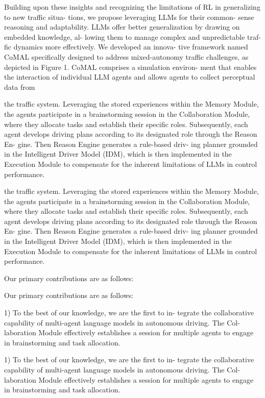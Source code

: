 \documentclass[12pt]{article}
\begin{document}
Building upon these insights and recognizing the
limitations of RL in generalizing to new traffic situa-
tions, we propose leveraging LLMs for their common-
sense reasoning and adaptability. LLMs offer better
generalization by drawing on embedded knowledge, al-
lowing them to manage complex and unpredictable traf-
fic dynamics more effectively. We developed an innova-
tive framework named CoMAL specifically designed to
address mixed-autonomy traffic challenges, as depicted
in Figure 1. CoMAL comprises a simulation environ-
ment that enables the interaction of individual LLM
agents and allows agents to collect perceptual data from


the traffic system. Leveraging the stored experiences
within the Memory Module, the agents participate in
a brainstorming session in the Collaboration Module,
where they allocate tasks and establish their specific
roles. Subsequently, each agent develops driving plans
according to its designated role through the Reason En-
gine. Then Reason Engine generates a rule-based driv-
ing planner grounded in the Intelligent Driver Model
(IDM), which is then implemented in the Execution
Module to compensate for the inherent limitations of
LLMs in control performance.


the traffic system. Leveraging the stored experiences
within the Memory Module, the agents participate in
a brainstorming session in the Collaboration Module,
where they allocate tasks and establish their specific
roles. Subsequently, each agent develops driving plans
according to its designated role through the Reason En-
gine. Then Reason Engine generates a rule-based driv-
ing planner grounded in the Intelligent Driver Model
(IDM), which is then implemented in the Execution
Module to compensate for the inherent limitations of
LLMs in control performance.


Our primary contributions are as follows:


Our primary contributions are as follows:


1) To the best of our knowledge, we are the first to in-
tegrate the collaborative capability of multi-agent
language models in autonomous driving. The Col-
laboration Module effectively establishes a session
for multiple agents to engage in brainstorming and
task allocation.


1) To the best of our knowledge, we are the first to in-
tegrate the collaborative capability of multi-agent
language models in autonomous driving. The Col-
laboration Module effectively establishes a session
for multiple agents to engage in brainstorming and
task allocation.
\end{document}
